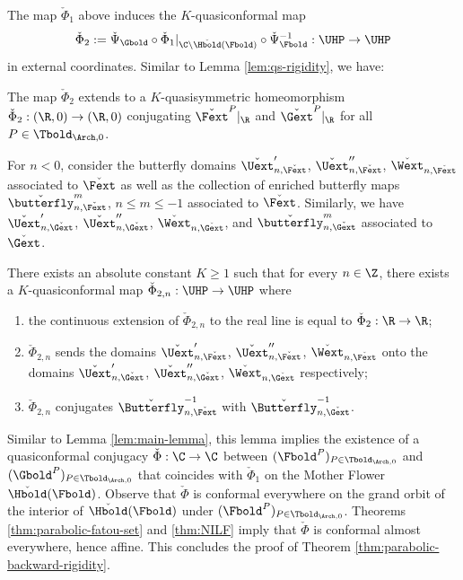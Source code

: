 \documentclass{amsart}
\begin{document}
The map $\check{\Phi}_1$ above induces the $K$-quasiconformal map
\[
    \check{\Phi}_2 := \check{\Psi}_{\Gbold} \circ 
    \check{\Phi}_1|_{\C \backslash \check{\Hbold}(\Fbold)} \circ 
    \check{\Psi}_{\Fbold}^{-1} : \UHP \to \UHP
\]
in external coordinates.
Similar to Lemma \ref{lem:qs-rigidity}, we have:

\begin{lemma}
    The map $\check{\Phi}_2$ extends to a $K$-quasisymmetric homeomorphism $\check{\Phi}_2: (\R,0) \to (\R,0)$ conjugating $\check{\Fext}^P|_{\R}$ and $\check{\Gext}^P|_{\R}$ for all $P \in \Tbold_{\Arch,0}$.
\end{lemma}

For $n <0$, consider the butterfly domains 
$\check{\Uext}'_{n,\check{\Fext}}$, $\check{\Uext}''_{n,\check{\Fext}}$, $\check{\Wext}_{n,\check{\Fext}}$ associated to $\check{\Fext}$
as well as the collection of enriched butterfly maps $\check{\butterfly}_{n,\check{\Fext}}^m$, $n \leq m \leq -1$ associated to $\check{\Fext}$.
Similarly, we have 
$\check{\Uext}'_{n,\check{\Gext}}$, $\check{\Uext}''_{n,\check{\Gext}}$, $\check{\Wext}_{n,\check{\Gext}}$, and $\check{\butterfly}_{n,\check{\Gext}}^m$ associated to $\check{\Gext}$.

\begin{lemma}
    There exists an absolute constant $K \geq 1$ such that for every $n \in \Z$, there exists a $K$-quasiconformal map $\check{\Phi}_{2,n}: \UHP \to \UHP$ where
    \begin{enumerate}
        \item the continuous extension of $\check{\Phi}_{2,n}$ to the real line is equal to $\check{\Phi}_2: \R \to \R$;
        \item $\check{\Phi}_{2,n}$ sends the domains $\check{\Uext}'_{n,\check{\Fext}}$, $\check{\Uext}''_{n,\check{\Fext}}$, $\check{\Wext}_{n,\check{\Fext}}$ onto the domains $\check{\Uext}'_{n,\check{\Gext}}$, $\check{\Uext}''_{n,\check{\Gext}}$, $\check{\Wext}_{n,\check{\Gext}}$ respectively;
        \item $\check{\Phi}_{2,n}$ conjugates $\check{\Butterfly}_{n,\check{\Fext}}^{-1}$ with $\check{\Butterfly}_{n,\check{\Gext}}^{-1}$.
    \end{enumerate}
\end{lemma}

Similar to Lemma \ref{lem:main-lemma}, this lemma implies the existence of a quasiconformal conjugacy $\check{\Phi}: \C \to \C$ between $(\Fbold^P)_{P \in \Tbold_{\Arch,0}}$ and $(\Gbold^P)_{P \in \Tbold_{\Arch,0}}$ that coincides with $\check{\Phi}_1$ on the Mother Flower $\check{\Hbold}(\Fbold)$.
Observe that $\check{\Phi}$ is conformal everywhere on the grand orbit of the interior of $\check{\Hbold}(\Fbold)$ under $(\Fbold^P)_{P \in \Tbold_{\Arch,0}}$.
Theorems \ref{thm:parabolic-fatou-set} and \ref{thm:NILF} imply that $\check{\Phi}$ is conformal almost everywhere, hence affine.
This concludes the proof of Theorem \ref{thm:parabolic-backward-rigidity}.
\end{document}
